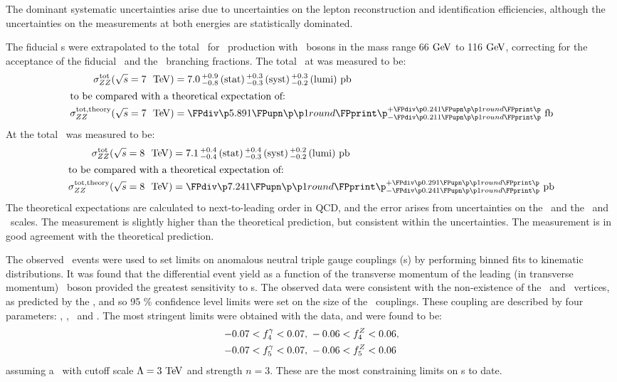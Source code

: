The dominant systematic uncertainties arise due to uncertainties on the lepton
reconstruction and identification efficiencies, although the uncertainties on
the measurements at both energies are statistically dominated.

The fiducial \cx s were extrapolated to the total \cx\ for \ZZ\
production with \Z\ bosons in the mass range 66$\GeV$ to 116$\GeV$, 
correcting for the acceptance of the fiducial \phasespace\ and the \Zll\
branching fractions. The total \cx\ at  was measured to be:
\begin{align}
\sigmaTotZZ(\sqrtseq{7}) &= \ZZSevenTeVTotalCrossSection \\
\intertext{to be compared with a theoretical expectation of:}
\sigmaTotTheoryZZ(\sqrtseq{7}) &= \ZZSevenTeVTheoryTotalCrossSection
\end{align}
At \sqrtseq{8} the total \cx\ was measured to be:
\begin{align}
\sigmaTotZZ(\sqrtseq{8}) &= \ZZEightTeVTotalCrossSection \\
\intertext{to be compared with a theoretical expectation of:}
\sigmaTotTheoryZZ(\sqrtseq{8}) &= \ZZEightTeVTheoryTotalCrossSection
\end{align}
The theoretical expectations are calculated to next-to-leading order in QCD, and
the error arises from uncertainties on the \partDF\ and the \fact\ and \renorm\
scales. The  measurement is slightly higher than the theoretical prediction,
but consistent within the uncertainties. The \sqrtseq{8} measurement is in good
agreement with the theoretical prediction. 

The observed \ZZllll\ events were used to set limits on anomalous neutral triple
gauge couplings (\TGC s) by performing binned fits to kinematic distributions.
It was found that the differential event yield as a function of the transverse
momentum of the leading (in transverse momentum) \Z\ boson provided the
greatest sensitivity to \TGC s. The observed data were consistent with the non-existence of the
\ZZZ\ and \ZZg\ vertices, as predicted by the \sm, and so 95 \% confidence level
limits were set on the size of the \TGC\ couplings. These coupling are
described by four parameters: \ffourg, \ffourZ, \ffiveg\ and \ffiveZ. The
most stringent limits were obtained with the \sqrtseq{8} data, and were found to
be:
\begin{align}
-0.07 < f_{4}^{\gamma} < 0.07, &\; -0.06 < f_{4}^{Z} < 0.06, \nonumber \\
-0.07 < f_{5}^{\gamma} < 0.07, &\; -0.06 < f_{5}^{Z} < 0.06
\end{align}
assuming a \formfactor\ with cutoff scale $\Lambda=3 \tev$ and strength $n=3$.
These are the most constraining limits on \TGC s to date.
